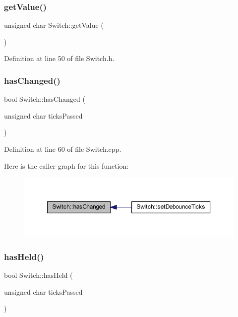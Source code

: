 \subsubsection{\texorpdfstring{get\+Value()}{getValue()}}
{\footnotesize\ttfamily unsigned char Switch\+::get\+Value (\begin{DoxyParamCaption}{ }\end{DoxyParamCaption})\hspace{0.3cm}{\ttfamily [inline]}}



Definition at line 50 of file Switch.\+h.

\mbox{\label{class_switch_a723c543e4e77a985ce0cdf195f6882ab}} 
\subsubsection{\texorpdfstring{has\+Changed()}{hasChanged()}}
{\footnotesize\ttfamily bool Switch\+::has\+Changed (\begin{DoxyParamCaption}\item[{unsigned char}]{ticks\+Passed }\end{DoxyParamCaption})}



Definition at line 60 of file Switch.\+cpp.

Here is the caller graph for this function\+:
\nopagebreak
\begin{figure}[H]
\begin{center}
\leavevmode
\includegraphics[width=350pt]{d9/d47/class_switch_a723c543e4e77a985ce0cdf195f6882ab_icgraph}
\end{center}
\end{figure}
\mbox{\label{class_switch_a6cb0b78f23c412042b31ce8af317c718}} 
\subsubsection{\texorpdfstring{has\+Held()}{hasHeld()}}
{\footnotesize\ttfamily bool Switch\+::has\+Held (\begin{DoxyParamCaption}\item[{unsigned char}]{ticks\+Passed }\end{DoxyParamCaption})}



